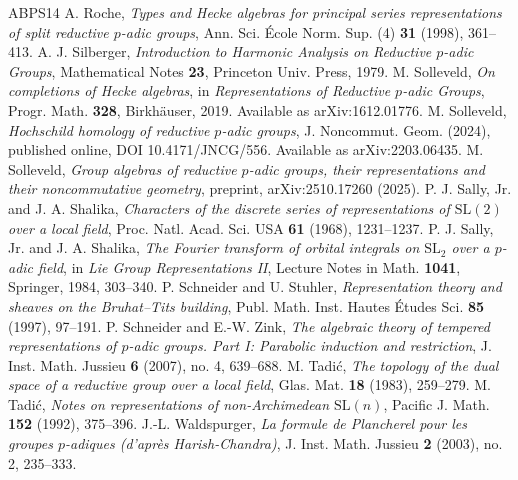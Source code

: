 \documentclass[12pt,letterpaper]{amsart}
\numberwithin{equation}{section}
\theoremstyle{definition}
\theoremstyle{remark}
\begin{document}
\begin{thebibliography}{ABPS14}
 A. Roche, \emph{Types and Hecke algebras for principal series representations of split reductive $p$-adic groups}, Ann. Sci. \'Ecole Norm. Sup. (4) \textbf{31} (1998), 361--413.
 A. J. Silberger, \emph{Introduction to Harmonic Analysis on Reductive $p$-adic Groups}, Mathematical Notes \textbf{23}, Princeton Univ. Press, 1979.
 M. Solleveld, \emph{On completions of Hecke algebras}, in \emph{Representations of Reductive $p$-adic Groups}, Progr. Math. \textbf{328}, Birkh\"auser, 2019. Available as arXiv:1612.01776.
 M. Solleveld, \emph{Hochschild homology of reductive $p$-adic groups}, J. Noncommut. Geom. (2024), published online, DOI 10.4171/JNCG/556. Available as arXiv:2203.06435.
 M. Solleveld, \emph{Group algebras of reductive $p$-adic groups, their representations and their noncommutative geometry}, preprint, arXiv:2510.17260 (2025).
 P. J. Sally, Jr. and J. A. Shalika, \emph{Characters of the discrete series of representations of $\mathrm{SL}(2)$ over a local field}, Proc. Natl. Acad. Sci. USA \textbf{61} (1968), 1231--1237.
 P. J. Sally, Jr. and J. A. Shalika, \emph{The Fourier transform of orbital integrals on $\mathrm{SL}_2$ over a $p$-adic field}, in \emph{Lie Group Representations II}, Lecture Notes in Math. \textbf{1041}, Springer, 1984, 303--340.
 P. Schneider and U. Stuhler, \emph{Representation theory and sheaves on the Bruhat--Tits building}, Publ. Math. Inst. Hautes \'Etudes Sci. \textbf{85} (1997), 97--191.
 P. Schneider and E.-W. Zink, \emph{The algebraic theory of tempered representations of $p$-adic groups. Part I: Parabolic induction and restriction}, J. Inst. Math. Jussieu \textbf{6} (2007), no. 4, 639--688.
 M. Tadi\'c, \emph{The topology of the dual space of a reductive group over a local field}, Glas. Mat. \textbf{18} (1983), 259--279.
 M. Tadi\'c, \emph{Notes on representations of non-Archimedean $\mathrm{SL}(n)$}, Pacific J. Math. \textbf{152} (1992), 375--396.
 J.-L. Waldspurger, \emph{La formule de Plancherel pour les groupes $p$-adiques (d'apr\`es Harish-Chandra)}, J. Inst. Math. Jussieu \textbf{2} (2003), no. 2, 235--333.
\end{thebibliography}
\end{document}
